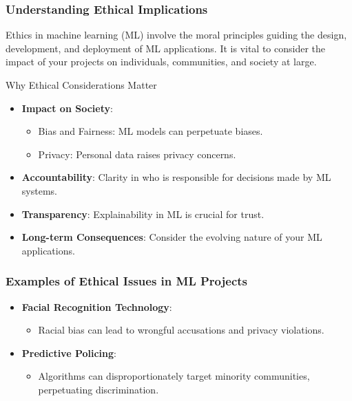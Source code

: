 \documentclass[aspectratio=169]{beamer}
\begin{document}
\begin{frame}[fragile]
    \frametitle{Understanding Ethical Implications}
    Ethics in machine learning (ML) involve the moral principles guiding the design, development, and deployment of ML applications. It is vital to consider the impact of your projects on individuals, communities, and society at large.
    
    \begin{block}{Why Ethical Considerations Matter}
        \begin{itemize}
            \item \textbf{Impact on Society}:
                \begin{itemize}
                    \item Bias and Fairness: ML models can perpetuate biases.
                    \item Privacy: Personal data raises privacy concerns.
                \end{itemize}
            \item \textbf{Accountability}: Clarity in who is responsible for decisions made by ML systems.
            \item \textbf{Transparency}: Explainability in ML is crucial for trust.
            \item \textbf{Long-term Consequences}: Consider the evolving nature of your ML applications.
        \end{itemize}
    \end{block}
\end{frame}

\begin{frame}[fragile]
    \frametitle{Examples of Ethical Issues in ML Projects}
    \begin{itemize}
        \item \textbf{Facial Recognition Technology}: 
            \begin{itemize}
                \item Racial bias can lead to wrongful accusations and privacy violations.
            \end{itemize}
        \item \textbf{Predictive Policing}:
            \begin{itemize}
                \item Algorithms can disproportionately target minority communities, perpetuating discrimination.
            \end{itemize}
    \end{itemize}
\end{frame}
\end{document}
